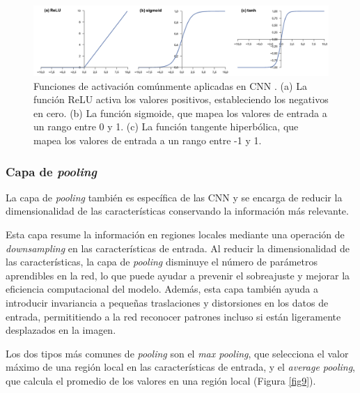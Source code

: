 \begin{figure}[h]
	\centering
	\includegraphics[scale=0.55]{imagenes/cap2/activation.png}
	\caption[Funciones de activación comunes.]{Funciones de activación comúnmente aplicadas en CNN \cite{40}. (a) La función ReLU activa los valores positivos, estableciendo los negativos en cero. (b) La función sigmoide, que mapea los valores de entrada a un rango entre 0 y 1. (c) La función tangente hiperbólica, que mapea los valores de entrada a un rango entre -1 y 1.}
	\label{fig8}
\end{figure}

\subsubsection*{Capa de \textit{pooling}}
La capa de \textit{pooling} también es específica de las CNN y se encarga de reducir la dimensionalidad de las características conservando la información más relevante.

Esta capa resume la información en regiones locales mediante una operación de \textit{downsampling} en las características de entrada. Al reducir la dimensionalidad de las características, la capa de \textit{pooling} disminuye el número de parámetros aprendibles en la red, lo que puede ayudar a prevenir el sobreajuste y mejorar la eficiencia computacional del modelo. Además, esta capa también ayuda a introducir invariancia a pequeñas traslaciones y distorsiones en los datos de entrada, permititiendo a la red reconocer patrones incluso si están ligeramente desplazados en la imagen. 

Los dos tipos más comunes de \textit{pooling} son el \textit{max pooling}, que selecciona el valor máximo de una región local en las características de entrada, y el \textit{average pooling}, que calcula el promedio de los valores en una región local (Figura \ref{fig9}).

